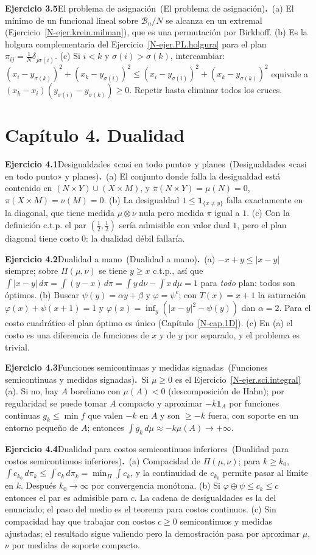\documentclass[11pt,a4paper]{amsart}
\newcommand{\B}{{\mathcal B}}
\newcommand{\I}{{\mathbf 1}}
\theoremstyle{remark}
\theoremstyle{definition}
\numberwithin{subsection}{section}
\numberwithin{equation}{section}
\newcommand{\ejlabel}[2]{\par\medskip\noindent\textbf{Ejercicio #1}\ifx\relax#2\relax\else\ (#2)\fi\textbf{.}\ }
\begin{document}
\ejlabel{3.5}{El problema de asignación}(a) El mínimo de un funcional lineal sobre $\B_n/N$ se alcanza en un extremal (Ejercicio~\ref{N-ejer.krein.milman}), que es una permutación por Birkhoff. (b) Es la holgura complementaria del Ejercicio~\ref{N-ejer.PL.holgura} para el plan $\pi_{ij}=\frac1N\delta_{j\sigma(i)}$. (c) Si $i<k$ y $\sigma(i)>\sigma(k)$, intercambiar: $(x_i-y_{\sigma(k)})^2+(x_k-y_{\sigma(i)})^2\le(x_i-y_{\sigma(i)})^2+(x_k-y_{\sigma(k)})^2$ equivale a $(x_k-x_i)(y_{\sigma(i)}-y_{\sigma(k)})\ge0$. Repetir hasta eliminar todos los cruces.

\section*{Capítulo 4. Dualidad}
\ejlabel{4.1}{Desigualdades «casi en todo punto» y planes}(a) El conjunto donde falla la desigualdad está contenido en $(N\times Y)\cup(X\times M)$, y $\pi(N\times Y)=\mu(N)=0$, $\pi(X\times M)=\nu(M)=0$. (b) La desigualdad $1\le\I_{\{x\ne y\}}$ falla exactamente en la diagonal, que tiene medida $\mu\otimes\nu$ nula pero medida $\pi$ igual a $1$. (c) Con la definición c.t.p. el par $(\frac12,\frac12)$ sería admisible con valor dual $1$, pero el plan diagonal tiene costo $0$: la dualidad débil fallaría.

\ejlabel{4.2}{Dualidad a mano}(a) $-x+y\le|x-y|$ siempre; sobre $\Pi(\mu,\nu)$ se tiene $y\ge x$ c.t.p., así que $\int|x-y|\,d\pi=\int(y-x)\,d\pi=\int y\,d\nu-\int x\,d\mu=1$ para \emph{todo} plan: todos son óptimos. (b) Buscar $\psi(y)=\alpha y+\beta$ y $\varphi=\psi^c$; con $T(x)=x+1$ la saturación $\varphi(x)+\psi(x+1)=1$ y $\varphi(x)=\inf_y(|x-y|^2-\psi(y))$ dan $\alpha=2$. Para el costo cuadrático el plan óptimo es único (Capítulo~\ref{N-cap.1D}). (c) En (a) el costo es una diferencia de funciones de $x$ y de $y$ por separado, y el problema es trivial.

\ejlabel{4.3}{Funciones semicontinuas y medidas signadas}Si $\mu\ge0$ es el Ejercicio~\ref{N-ejer.sci.integral}(a). Si no, hay $A$ boreliano con $\mu(A)<0$ (descomposición de Hahn); por regularidad se puede tomar $A$ compacto y aproximar $-k\I_A$ por funciones continuas $g_k\le\min f$ que valen $-k$ en $A$ y son $\ge-k$ fuera, con soporte en un entorno pequeño de $A$; entonces $\int g_k\,d\mu\approx-k\mu(A)\to+\infty$.

\ejlabel{4.4}{Dualidad para costos semicontinuos inferiores}(a) Compacidad de $\Pi(\mu,\nu)$; para $k\ge k_0$, $\int c_{k_0}\,d\pi_k\le\int c_k\,d\pi_k=\min_\Pi\int c_k$, y la continuidad de $c_{k_0}$ permite pasar al límite en $k$. Después $k_0\to\infty$ por convergencia monótona. (b) Si $\varphi\oplus\psi\le c_k\le c$ entonces el par es admisible para $c$. La cadena de desigualdades es la del enunciado; el paso del medio es el teorema para costos continuos. (c) Sin compacidad hay que trabajar con costos $c\ge0$ semicontinuos y medidas ajustadas; el resultado sigue valiendo pero la demostración pasa por aproximar $\mu$, $\nu$ por medidas de soporte compacto.
\end{document}
